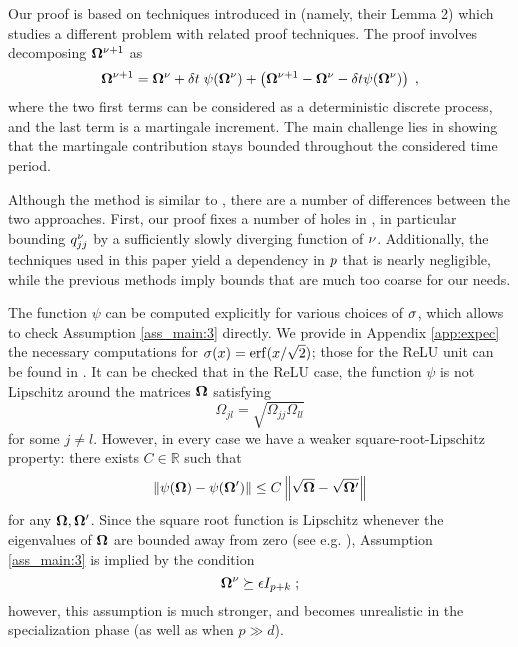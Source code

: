 \documentclass[10pt]{article}
\begin{document}
%
%
Our proof is based on techniques introduced in \cite{wang_2018} (namely, their Lemma 2) which studies a different problem with related proof techniques. The proof involves decomposing $\bm{\Omega}^{\nu+1}$ as 
\begin{equation}
     \bm{\Omega}^{\nu+1} = \bm{\Omega}^\nu +  \delta t \; \psi(\bm{\Omega}^\nu) + \left(\bm{\Omega}^{\nu+1} - \bm{\Omega}^\nu - \delta t \psi(\bm{\Omega}^\nu)\right) \;,
\end{equation}
where the two first terms can be considered as a deterministic discrete process, and the last term is a martingale increment. The main challenge lies in showing that the martingale contribution stays bounded throughout the considered time period. 

Although the method is similar to \cite{goldt_2019}, there are a number of differences between the two approaches. First, our proof fixes a number of holes in \cite{goldt_2019}, in particular bounding $q_{jj}^\nu$ by a sufficiently slowly diverging function of $\nu$. Additionally, the techniques used in this paper yield a dependency in $p$ that is nearly negligible, while the previous methods imply bounds that are much too coarse for our needs. %

The function $\psi$ can be computed explicitly for various choices of $\sigma$, which allows to check Assumption \ref{ass_main:3} directly. We provide in Appendix \ref{app:expec} the necessary computations for $\act(x) = \erf(x/\sqrt{2})$; those for the ReLU unit can be found in \cite{yoshida_2017_statistical}. It can be checked that in the ReLU case, the function $\psi$ is not Lipschitz around the matrices $\bm{\Omega}$ satisfying
\[ \Omega_{jl} = \sqrt{\Omega_{jj} \Omega_{ll}}\]
for some $j \neq l$. However, in every case we have a weaker square-root-Lipschitz property: there exists $C \in  \mathbb R$ such that
\[ \lVert \psi(\bm{\Omega}) - \psi(\bm{\Omega}') \rVert \leq C \left\lVert \sqrt{\bm{\Omega}} - \sqrt{\bm{\Omega}'} \right\rVert \]
for any $\bm{\Omega}, \bm{\Omega}'$. Since the square root function is Lipschitz whenever the eigenvalues of $\bm{\Omega}$ are bounded away from zero (see e.g. \cite{delmoral_2018}), Assumption \ref{ass_main:3} is implied by the condition
\[ \bm{\Omega}^\nu \succeq \epsilon I_{p+k} \; ; \]
however, this assumption is much stronger, and becomes unrealistic in the specialization phase (as well as when $p \gg d$).

\end{document}
